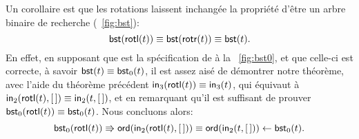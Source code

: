 Un corollaire est que les rotations laissent inchangée la propriété
d'être un arbre binaire de recherche (\fig~\vref{fig:bst}):
\begin{equation*}
\abovedisplayskip=5pt
\belowdisplayskip=5pt
\fun{bst}(\fun{rotl}(t)) \equiv \fun{bst}(\fun{rotr}(t)) \equiv \fun{bst}(t).
\end{equation*}
En effet, en supposant que  est la spécification de
 à la \fig~\vref{fig:bst0}, et que celle-ci est
correcte, à savoir \(\textsf{bst}(t) \equiv \textsf{bst}_0(t)\), il est
assez aisé de démontrer notre théorème, avec l'aide du théorème
précédent \(\textsf{in}_3(\textsf{rotl}(t)) \equiv \textsf{in}_3(t)\), qui
équivaut à \(\textsf{in}_2(\textsf{rotl}(t),[\,]) \equiv \textsf{in}_2(t,[\,])\),
et en remarquant qu'il est suffisant de prouver
\(\textsf{bst}_0(\textsf{rotl}(t)) \equiv \textsf{bst}_0(t)\). Nous concluons
alors:
\begin{equation*}
\textsf{bst}_0(\textsf{rotl}(t))
\Rrightarrow \textsf{ord}(\textsf{in}_2(\textsf{rotl}(t),[\,]))
\equiv \textsf{ord}(\textsf{in}_2(t,[\,]))
\leftarrow \textsf{bst}_0(t).
\end{equation*}


